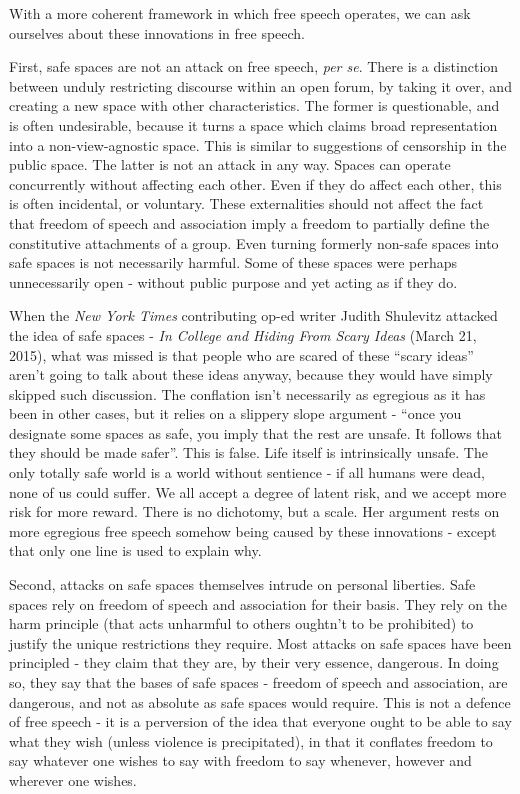 \documentclass[10pt,a4paper,twoside]{article}
\begin{document}
\begin{multicols}{2}
With a more coherent framework in which free speech operates, we can ask
ourselves about these innovations in free speech.

First, safe spaces are not an attack on free speech, \emph{per se}.
There is a distinction between unduly restricting discourse within an
open forum, by taking it over, and creating a new space with other
characteristics. The former is questionable, and is often undesirable,
because it turns a space which claims broad representation into a
non-view-agnostic space. This is similar to suggestions of censorship in
the public space. The latter is not an attack in any way. Spaces can
operate concurrently without affecting each other. Even if they do
affect each other, this is often incidental, or voluntary. These
externalities should not affect the fact that freedom of speech and
association imply a freedom to partially define the constitutive
attachments of a group. Even turning formerly non-safe spaces into safe
spaces is not necessarily harmful. Some of these spaces were perhaps
unnecessarily open - without public purpose and yet acting as if they
do.

When the \emph{New York Times} contributing op-ed writer Judith
Shulevitz attacked the idea of safe spaces - \emph{In College and Hiding
	From Scary Ideas} (March 21, 2015), what was missed is that people who
are scared of these ``scary ideas'' aren't going to talk about these
ideas anyway, because they would have simply skipped such discussion.
The conflation isn't necessarily as egregious as it has been in other
cases, but it relies on a slippery slope argument - ``once you designate
some spaces as safe, you imply that the rest are unsafe. It follows that
they should be made safer''. This is false. Life itself is intrinsically
unsafe. The only totally safe world is a world without sentience - if
all humans were dead, none of us could suffer. We all accept a degree of
latent risk, and we accept more risk for more reward. There is no
dichotomy, but a scale. Her argument rests on more egregious free speech
somehow being caused by these innovations - except that only one line is
used to explain why.

Second, attacks on safe spaces themselves intrude on personal liberties.
Safe spaces rely on freedom of speech and association for their basis.
They rely on the harm principle (that acts unharmful to others oughtn't
to be prohibited) to justify the unique restrictions they require. Most
attacks on safe spaces have been principled - they claim that they are,
by their very essence, dangerous. In doing so, they say that the bases
of safe spaces - freedom of speech and association, are dangerous, and
not as absolute as safe spaces would require. This is not a defence of
free speech - it is a perversion of the idea that everyone ought to be
able to say what they wish (unless violence is precipitated), in that it
conflates freedom to say whatever one wishes to say with freedom to say
whenever, however and wherever one wishes.


\end{multicols}
\end{document}
